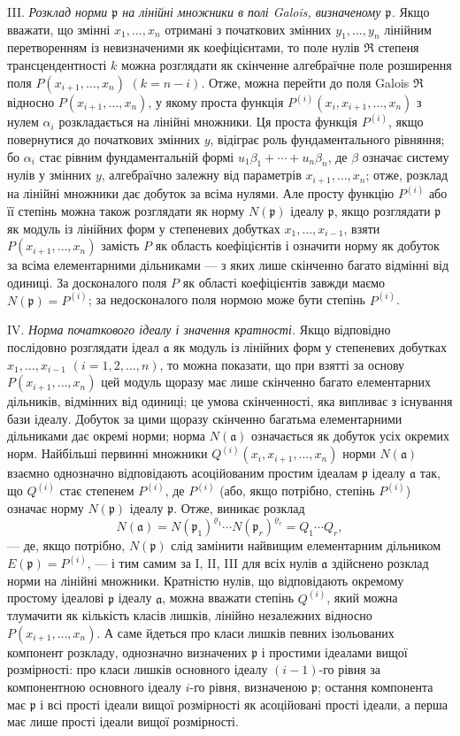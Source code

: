 \documentclass[11pt]{article}
\providecommand{\fraka}{\mathfrak a}
\providecommand{\frakp}{\mathfrak p}
\providecommand{\frakR}{\mathfrak R}
\begin{document}
\noindent III. \emph{Розклад норми $\frakp$ на лінійні множники в полі Galois, визначеному $\frakp$.} Якщо вважати, що змінні $x_1,\ldots,x_n$ отримані з початкових змінних $y_1,\ldots,y_n$ лінійним перетворенням із невизначеними як коефіцієнтами, то поле нулів $\frakR$ степеня трансцендентності $k$ можна розглядати як скінченне алгебраїчне поле розширення поля $P(x_{i+1},\ldots,x_n)$ $(k=n-i)$. Отже, можна перейти до поля Galois $\frakR$ відносно $P(x_{i+1},\ldots,x_n)$, у якому проста функція $P^{(i)}(x_i,x_{i+1},\ldots,x_n)$ з нулем $\alpha_i$ розкладається на лінійні множники. Ця проста функція $P^{(i)}$, якщо повернутися до початкових змінних $y$, відіграє роль фундаментального рівняння; бо $\alpha_i$ стає рівним фундаментальній формі $u_1\beta_1+\cdots+u_n\beta_n$, де $\beta$ означає систему нулів у змінних $y$, алгебраїчно залежну від параметрів $x_{i+1},\ldots,x_n$; отже, розклад на лінійні множники дає добуток за всіма нулями. Але просту функцію $P^{(i)}$ або її степінь можна також розглядати як норму $N(\frakp)$ ідеалу $\frakp$, якщо розглядати $\frakp$ як модуль із лінійних форм у степеневих добутках $x_1,\ldots,x_{i-1}$, взяти $P(x_{i+1},\ldots,x_n)$ замість $P$ як область коефіцієнтів і означити норму як добуток за всіма елементарними дільниками --- з яких лише скінченно багато відмінні від одиниці. За досконалого поля $P$ як області коефіцієнтів завжди маємо $N(\frakp)=P^{(i)}$; за недосконалого поля нормою може бути степінь $P^{(i)}$.

\noindent IV. \emph{Норма початкового ідеалу і значення кратності.} Якщо відповідно послідовно розглядати ідеал $\fraka$ як модуль із лінійних форм у степеневих добутках $x_1,\ldots,x_{i-1}$ $(i=1,2,\ldots,n)$, то можна показати, що при взятті за основу $P(x_{i+1},\ldots,x_n)$ цей модуль щоразу має лише скінченно багато елементарних дільників, відмінних від одиниці; це умова скінченності, яка випливає з існування бази ідеалу. Добуток за цими щоразу скінченно багатьма елементарними дільниками дає окремі норми; норма $N(\fraka)$ означається як добуток усіх окремих норм. Найбільші первинні множники $Q^{(i)}(x_i,x_{i+1},\ldots,x_n)$ норми $N(\fraka)$ взаємно однозначно відповідають асоційованим простим ідеалам $\frakp$ ідеалу $\fraka$ так, що $Q^{(i)}$ стає степенем $P^{(i)}$, де $P^{(i)}$ (або, якщо потрібно, степінь $P^{(i)}$) означає норму $N(\frakp)$ ідеалу $\frakp$. Отже, виникає розклад
\[
 N(\fraka)=N(\frakp_1)^{\varrho_1}\cdots N(\frakp_r)^{\varrho_r}=Q_1\cdots Q_r,
\]
--- де, якщо потрібно, $N(\frakp)$ слід замінити найвищим елементарним дільником $E(\frakp)=P^{(i)}$, --- і тим самим за I, II, III для всіх нулів $\fraka$ здійснено розклад норми на лінійні множники. Кратністю нулів, що відповідають окремому простому ідеалові $\frakp$ ідеалу $\fraka$, можна вважати степінь $Q^{(i)}$, який можна тлумачити як кількість класів лишків, лінійно незалежних відносно $P(x_{i+1},\ldots,x_n)$. А саме йдеться про класи лишків певних ізольованих компонент розкладу, однозначно визначених $\frakp$ і простими ідеалами вищої розмірності: про класи лишків основного ідеалу $(i-1)$-го рівня за компонентною основного ідеалу $i$-го рівня, визначеною $\frakp$; остання компонента має $\frakp$ і всі прості ідеали вищої розмірності як асоційовані прості ідеали, а перша має лише прості ідеали вищої розмірності.
\end{document}
